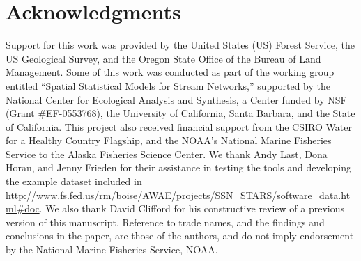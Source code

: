 \documentclass[article]{jss}
\begin{document}
%
%

\section*{Acknowledgments}

Support for this work was provided by the United States (US) Forest
Service, the US Geological Survey, and the Oregon State Office of the
Bureau of Land Management. Some of this work was conducted as part of
the working group entitled ``Spatial Statistical Models for Stream
Networks,'' supported by the National Center for Ecological Analysis
and Synthesis, a Center funded by NSF (Grant \#EF-0553768), the
University of California, Santa Barbara, and the State of
California. This project also received financial support from the
CSIRO Water for a Healthy Country Flagship, and the NOAA's National
Marine Fisheries Service to the Alaska Fisheries Science
Center. We thank Andy Last, Dona Horan, and Jenny Frieden for their assistance in testing the  tools and developing the example dataset included in \url{http://www.fs.fed.us/rm/boise/AWAE/projects/SSN_STARS/software_data.html#doc}. We also thank David Clifford for his constructive review of a previous version of this manuscript. Reference to trade names, and the findings and conclusions in the paper, are those of the authors, and do not imply endorsement by the National Marine Fisheries Service, NOAA.



\end{document}
